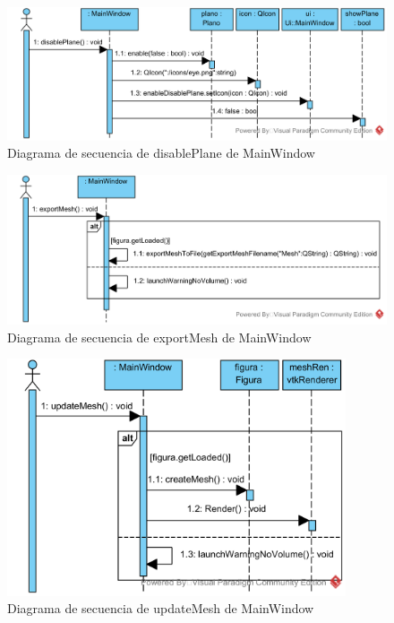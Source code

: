 \begin{figure}[H]
	\centering
	\includegraphics[width=12cm]{imagenes/diagramas/secuencia/MainWindow_DisablePlane}
	\caption{Diagrama de secuencia de disablePlane de MainWindow}
	\label{fig:diagrama_secuencia_mainWindow_disablePlane}
\end{figure}

\begin{figure}[H]
	\centering
	\includegraphics[width=12cm]{imagenes/diagramas/secuencia/MainWindow_ExportMesh}
	\caption{Diagrama de secuencia de exportMesh de MainWindow}
	\label{fig:diagrama_secuencia_mainWindow_exportMesh}
\end{figure}

\begin{figure}[H]
	\centering
	\includegraphics[width=10cm]{imagenes/diagramas/secuencia/MainWindow_UpdateMesh}
	\caption{Diagrama de secuencia de updateMesh de MainWindow}
	\label{fig:diagrama_secuencia_mainWindow_updateMesh}
\end{figure}

